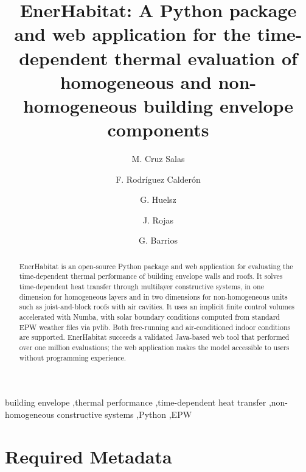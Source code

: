 \documentclass[preprint,12pt, a4paper]{elsarticle}
\begin{document}
\renewcommand{\labelenumii}{\arabic{enumi}.\arabic{enumii}}

\begin{frontmatter}

\title{EnerHabitat: A Python package and web application for the time-dependent thermal evaluation of homogeneous and non-homogeneous building envelope components}

\author[ier]{M. Cruz Salas}
\author[ipn]{F. Rodr\'iguez Calder\'on}
\author[ier]{G. Huelsz}
\author[ier]{J. Rojas}
\author[ier]{G. Barrios}


\address[ier]{Instituto de Energ\'ias Renovables, Universidad Nacional Aut\'onoma de M\'exico, Priv. Xochicalco s/n, Col. Centro, 62580 Temixco, Mor., Mexico}
\address[ipn]{Instituto Polit\'ecnico Nacional, Mexico}

\begin{abstract}
EnerHabitat is an open-source Python package and web application for evaluating the time-dependent thermal performance of building envelope walls and roofs. It solves time-dependent heat transfer through multilayer constructive systems, in one dimension for homogeneous layers and in two dimensions for non-homogeneous units such as joist-and-block roofs with air cavities. It uses an implicit finite control volumes accelerated with Numba, with solar boundary conditions computed from standard EPW weather files via pvlib. Both free-running and air-conditioned indoor conditions are supported. EnerHabitat succeeds a validated Java-based web tool that performed over one million evaluations; the web application makes the model accessible to users without programming experience.
\end{abstract}

\begin{keyword}
building envelope \sep thermal performance \sep time-dependent heat transfer \sep non-homogeneous constructive systems \sep Python \sep EPW
\end{keyword}

\end{frontmatter}

\section*{Required Metadata}
\label{sec:metadata}
\end{document}
